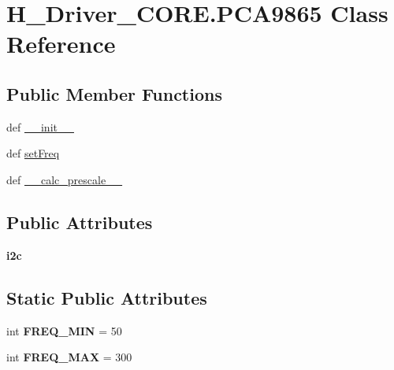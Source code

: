 \hypertarget{classH__Driver__CORE_1_1PCA9865}{}\section{H\+\_\+\+Driver\+\_\+\+C\+O\+R\+E.\+P\+C\+A9865 Class Reference}
\label{classH__Driver__CORE_1_1PCA9865}
\subsection*{Public Member Functions}
\begin{DoxyCompactItemize}
\item 
def \hyperlink{classH__Driver__CORE_1_1PCA9865_ad55ae8ab9ca6bd8381edde60fcf886c1}{\+\_\+\+\_\+init\+\_\+\+\_\+}
\item 
def \hyperlink{classH__Driver__CORE_1_1PCA9865_a746e1e3746dec4f182484e4dddeea50a}{set\+Freq}
\item 
def \hyperlink{classH__Driver__CORE_1_1PCA9865_a5724a0ad0d377db94c552640986a8cba}{\+\_\+\+\_\+calc\+\_\+prescale\+\_\+\+\_\+}
\end{DoxyCompactItemize}
\subsection*{Public Attributes}
\begin{DoxyCompactItemize}
\item 
\hypertarget{classH__Driver__CORE_1_1PCA9865_ac22b8744829ffb2e6eda8bdeea34e398}{}{\bfseries i2c}\label{classH__Driver__CORE_1_1PCA9865_ac22b8744829ffb2e6eda8bdeea34e398}

\end{DoxyCompactItemize}
\subsection*{Static Public Attributes}
\begin{DoxyCompactItemize}
\item 
\hypertarget{classH__Driver__CORE_1_1PCA9865_a2318d8d4faca392d39776aed8ab66ebc}{}int {\bfseries F\+R\+E\+Q\+\_\+\+M\+I\+N} = 50\label{classH__Driver__CORE_1_1PCA9865_a2318d8d4faca392d39776aed8ab66ebc}

\item 
\hypertarget{classH__Driver__CORE_1_1PCA9865_ae8e739fb7135848ec137f39bf49bb458}{}int {\bfseries F\+R\+E\+Q\+\_\+\+M\+A\+X} = 300\label{classH__Driver__CORE_1_1PCA9865_ae8e739fb7135848ec137f39bf49bb458}

\end{DoxyCompactItemize}



